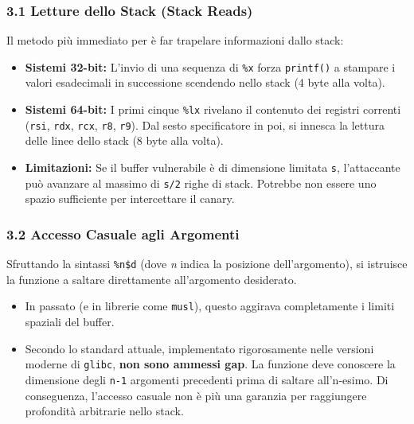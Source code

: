 \documentclass{article}
\begin{document}
\subsubsection{3.1 Letture dello Stack (Stack Reads)}
Il metodo più immediato per è far trapelare informazioni dallo stack:
\begin{itemize}
    \item \textbf{Sistemi 32-bit:} L'invio di una sequenza di \texttt{\%x} forza \texttt{printf()} a stampare i valori esadecimali in successione scendendo nello stack (4 byte alla volta).
    \item \textbf{Sistemi 64-bit:} I primi cinque \texttt{\%lx} rivelano il contenuto dei registri correnti (\texttt{rsi}, \texttt{rdx}, \texttt{rcx}, \texttt{r8}, \texttt{r9}). Dal sesto specificatore in poi, si innesca la lettura delle linee dello stack (8 byte alla volta).
    \item \textbf{Limitazioni:} Se il buffer vulnerabile è di dimensione limitata \texttt{s}, l'attaccante può avanzare al massimo di \texttt{s/2} righe di stack. Potrebbe non essere uno spazio sufficiente per intercettare il canary.
\end{itemize}

\subsubsection{3.2 Accesso Casuale agli Argomenti}
Sfruttando la sintassi \texttt{\%n\$d} (dove \emph{n} indica la posizione dell'argomento), si istruisce la funzione a saltare direttamente all'argomento desiderato.
\begin{itemize}
    \item In passato (e in librerie come \texttt{musl}), questo aggirava completamente i limiti spaziali del buffer.
    \item Secondo lo standard attuale, implementato rigorosamente nelle versioni moderne di \texttt{glibc}, \textbf{non sono ammessi gap}. La funzione deve conoscere la dimensione degli \texttt{n-1} argomenti precedenti prima di saltare all'n-esimo. Di conseguenza, l'accesso casuale non è più una garanzia per raggiungere profondità arbitrarie nello stack.
\end{itemize}
\end{document}
